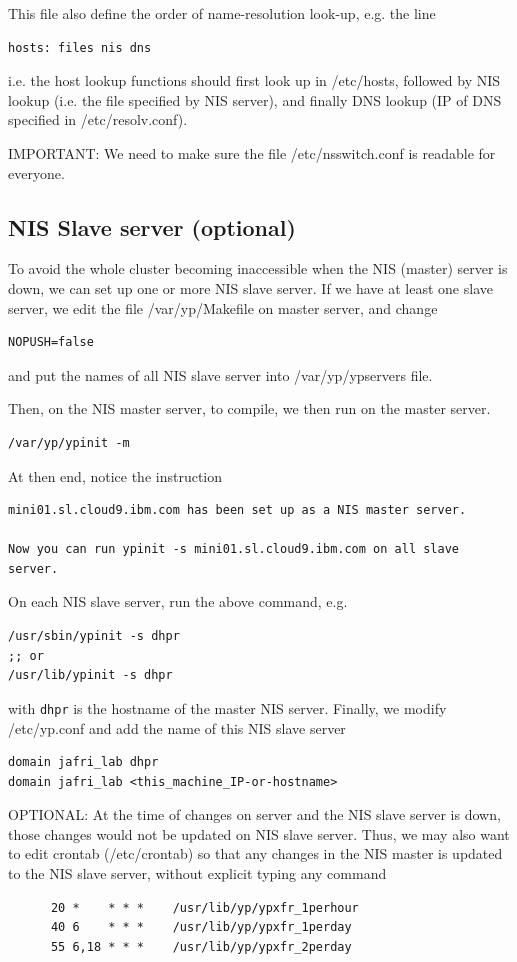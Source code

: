 This file also define the order of name-resolution look-up, e.g. the line
\begin{verbatim}
hosts: files nis dns
\end{verbatim}
i.e. the host lookup functions should first look up in /etc/hosts,
followed by NIS lookup (i.e. the file specified by NIS server), and finally DNS
lookup (IP of DNS specified in /etc/resolv.conf). 


IMPORTANT: We need to make sure the file /etc/nsswitch.conf is readable for
everyone.


\subsection{NIS Slave server (optional)}
\label{sec:NIS_slave_server}

To avoid the whole cluster becoming inaccessible when the NIS (master) server is
down, we can set up one or more NIS slave server. If we have at least one slave
server, we edit the file /var/yp/Makefile on master server, and change
\begin{verbatim}
NOPUSH=false
\end{verbatim}
and put the names of all NIS slave server into /var/yp/ypservers file. 

Then, on the NIS master server, to compile, we then run on the master server.
\begin{verbatim}
/var/yp/ypinit -m
\end{verbatim} 

At then end, notice the instruction
\begin{verbatim}
mini01.sl.cloud9.ibm.com has been set up as a NIS master server.

Now you can run ypinit -s mini01.sl.cloud9.ibm.com on all slave server.
\end{verbatim}

On each NIS slave server, run the above command, e.g. 
\begin{verbatim}
/usr/sbin/ypinit -s dhpr
;; or
/usr/lib/ypinit -s dhpr
\end{verbatim}
with \verb!dhpr! is the hostname of the master NIS server. Finally, we modify
/etc/yp.conf and add the name of this NIS slave server
\begin{verbatim}
domain jafri_lab dhpr
domain jafri_lab <this_machine_IP-or-hostname>
\end{verbatim}

OPTIONAL: At the time of changes on server and the NIS slave server is down,
those changes would not be updated on NIS slave server. Thus, we may also want
to edit crontab (/etc/crontab) so that any changes in the NIS master is updated
to the NIS slave server, without explicit typing any command
\begin{verbatim}
      20 *    * * *    /usr/lib/yp/ypxfr_1perhour
      40 6    * * *    /usr/lib/yp/ypxfr_1perday
      55 6,18 * * *    /usr/lib/yp/ypxfr_2perday
\end{verbatim}

